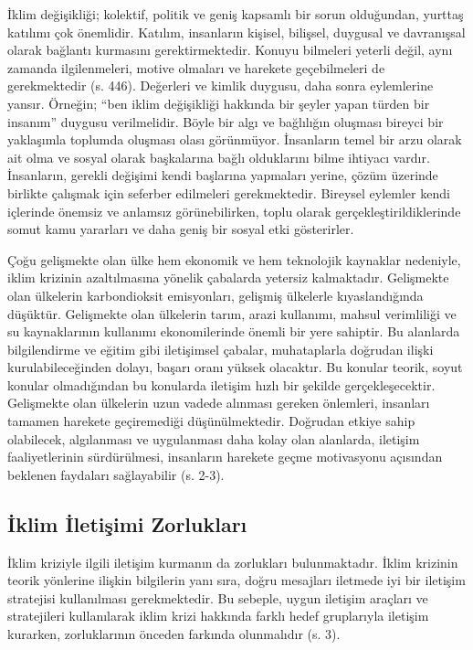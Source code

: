 \documentclass[
]{book}
\begin{document}
İklim değişikliği; kolektif, politik ve geniş kapsamlı bir sorun olduğundan, yurttaş katılımı çok önemlidir. Katılım, insanların kişisel, bilişsel, duygusal ve davranışsal olarak bağlantı kurmasını gerektirmektedir. Konuyu bilmeleri yeterli değil, aynı zamanda ilgilenmeleri, motive olmaları ve harekete geçebilmeleri de gerekmektedir (s. 446). \citep{lorenzoni2007barriers} Değerleri ve kimlik duygusu, daha sonra eylemlerine yansır. Örneğin; ``ben iklim değişikliği hakkında bir şeyler yapan türden bir insanım'' duygusu verilmelidir. Böyle bir algı ve bağlılığın oluşması bireyci bir yaklaşımla toplumda oluşması olası görünmüyor. İnsanların temel bir arzu olarak ait olma ve sosyal olarak başkalarına bağlı olduklarını bilme ihtiyacı vardır. İnsanların, gerekli değişimi kendi başlarına yapmaları yerine, çözüm üzerinde birlikte çalışmak için seferber edilmeleri gerekmektedir. Bireysel eylemler kendi içlerinde önemsiz ve anlamsız görünebilirken, toplu olarak gerçekleştirildiklerinde somut kamu yararları ve daha geniş bir sosyal etki gösterirler. \citep{hansen2020ireland}

Çoğu gelişmekte olan ülke hem ekonomik ve hem teknolojik kaynaklar nedeniyle, iklim krizinin azaltılmasına yönelik çabalarda yetersiz kalmaktadır. Gelişmekte olan ülkelerin karbondioksit emisyonları, gelişmiş ülkelerle kıyaslandığında düşüktür. Gelişmekte olan ülkelerin tarım, arazi kullanımı, mahsul verimliliği ve su kaynaklarının kullanımı ekonomilerinde önemli bir yere sahiptir. Bu alanlarda bilgilendirme ve eğitim gibi iletişimsel çabalar, muhataplarla doğrudan ilişki kurulabileceğinden dolayı, başarı oranı yüksek olacaktır. Bu konular teorik, soyut konular olmadığından bu konularda iletişim hızlı bir şekilde gerçekleşecektir. Gelişmekte olan ülkelerin uzun vadede alınması gereken önlemleri, insanları tamamen harekete geçiremediği düşünülmektedir. Doğrudan etkiye sahip olabilecek, algılanması ve uygulanması daha kolay olan alanlarda, iletişim faaliyetlerinin sürdürülmesi, insanların harekete geçme motivasyonu açısından beklenen faydaları sağlayabilir (s. 2-3). \citep{leal2019overview}

\hypertarget{iklim-iletiux15fimi-zorluklarux131}{%
\subsection{İklim İletişimi Zorlukları}\label{iklim-iletiux15fimi-zorluklarux131}}

İklim kriziyle ilgili iletişim kurmanın da zorlukları bulunmaktadır. İklim krizinin teorik yönlerine ilişkin bilgilerin yanı sıra, doğru mesajları iletmede iyi bir iletişim stratejisi kullanılması gerekmektedir. Bu sebeple, uygun iletişim araçları ve stratejileri kullanılarak iklim krizi hakkında farklı hedef gruplarıyla iletişim kurarken, zorluklarının önceden farkında olunmalıdır (s. 3). \citep{leal2019overview}
\end{document}
